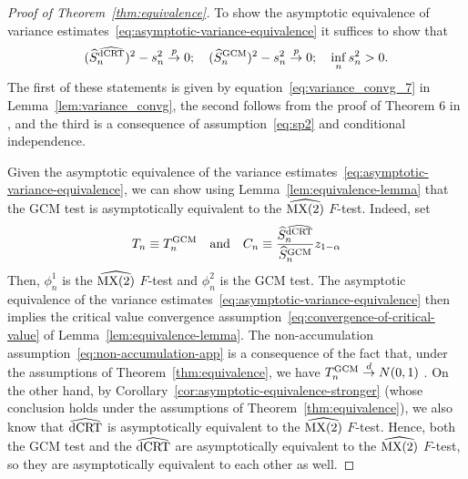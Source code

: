 \documentclass[aos]{imsart}
\theoremstyle{plain}
\theoremstyle{remark}
\newcommand{\convp}{\overset p \rightarrow}             %
\newcommand{\convd}{\overset d \rightarrow}             %
\newcommand{\GCM}{\textnormal{GCM}}						%
\newcommand{\dCRThat}{\widehat{\textnormal{dCRT}}}		%
\newcommand{\MXtwohat}{\widehat{\textnormal{MX(2)}}}	%
\begin{document}
\begin{proof}[Proof of Theorem~\ref{thm:equivalence}]

To show the asymptotic equivalence of variance estimates~\eqref{eq:asymptotic-variance-equivalence} it suffices to show that
\begin{equation}
(\widehat S_n^{\dCRThat})^2 - s^2_n \convp 0; \quad (\widehat S_n^{\GCM})^2 - s^2_n \convp 0; \quad \inf_{n} s^2_n > 0.
\end{equation}
The first of these statements is given by equation~\eqref{eq:variance_convg_7} in Lemma~\ref{lem:variance_convg}, the second follows from the proof of Theorem 6 in \citet{Shah2018}, and the third is a consequence of assumption~\eqref{eq:sp2} and conditional independence.
  
Given the asymptotic equivalence of the variance estimates~\eqref{eq:asymptotic-variance-equivalence}, we can show using Lemma~\ref{lem:equivalence-lemma} that the GCM test is asymptotically equivalent to the $\MXtwohat$ $F$-test. Indeed, set
\begin{equation}
	T_n \equiv T_n^\GCM \quad \text{and} \quad C_n \equiv \frac{\widehat S_n^{\dCRThat}}{\widehat S_{n}^{\GCM}}z_{1-\alpha}
\end{equation}
Then, $\phi_n^1$ is the $\MXtwohat$ $F$-test and $\phi_n^2$ is the GCM test. The asymptotic equivalence of the variance estimates~\eqref{eq:asymptotic-variance-equivalence} then implies the critical value convergence assumption~\eqref{eq:convergence-of-critical-value} of Lemma~\ref{lem:equivalence-lemma}. The non-accumulation assumption~\eqref{eq:non-accumulation-app} is a consequence of the fact that, under the assumptions of Theorem~\ref{thm:equivalence}, we have $T^{\text{\GCM}}_n \convd N(0,1)$ \citep{Shah2018}. On the other hand, by Corollary~\ref{cor:asymptotic-equivalence-stronger} (whose conclusion holds under the assumptions of Theorem~\ref{thm:equivalence}), we also know that $\dCRThat$ is asymptotically equivalent to the $\MXtwohat$ $F$-test. Hence, both the GCM test and the $\dCRThat$ are asymptotically equivalent to the $\MXtwohat$ $F$-test, so they are asymptotically equivalent to each other as well.
\end{proof}
\end{document}
